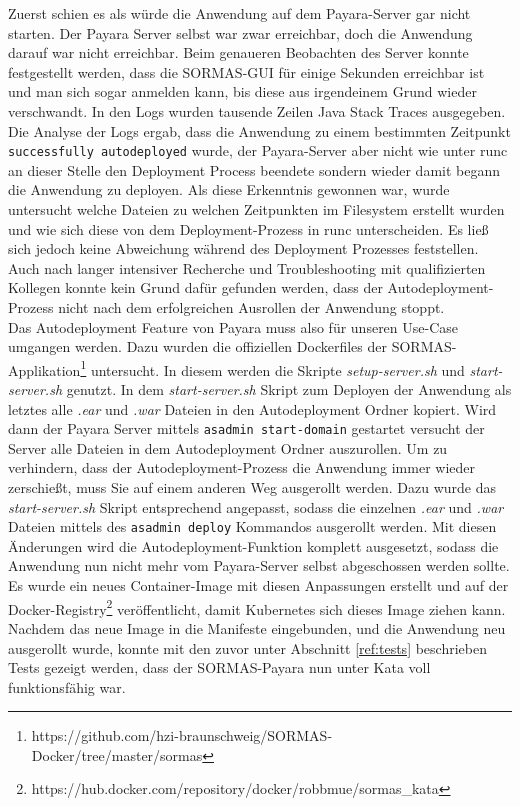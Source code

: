 Zuerst schien es als würde die Anwendung auf dem Payara-Server gar nicht starten. 
Der Payara Server selbst war zwar erreichbar, doch die Anwendung darauf war nicht erreichbar.
Beim genaueren Beobachten des Server konnte festgestellt werden, dass die \ac{SORMAS}-\ac{GUI} für einige Sekunden erreichbar ist und man sich sogar anmelden kann, bis diese aus irgendeinem Grund wieder verschwandt.
In den Logs wurden tausende Zeilen Java Stack Traces ausgegeben. 
Die Analyse der Logs ergab, dass die Anwendung zu einem bestimmten Zeitpunkt \texttt{successfully autodeployed} wurde, der Payara-Server aber nicht wie unter runc an dieser Stelle den Deployment Process beendete sondern wieder damit begann die Anwendung zu deployen.
Als diese Erkenntnis gewonnen war, wurde untersucht welche Dateien zu welchen Zeitpunkten im Filesystem erstellt wurden und wie sich diese von dem Deployment-Prozess in runc unterscheiden. 
Es ließ sich jedoch keine Abweichung während des Deployment Prozesses feststellen.
Auch nach langer intensiver Recherche und Troubleshooting mit qualifizierten Kollegen konnte kein Grund dafür gefunden werden, dass der Autodeployment-Prozess nicht nach dem erfolgreichen Ausrollen der Anwendung stoppt. 
\\
Das Autodeployment Feature von Payara muss also für unseren Use-Case umgangen werden. 
Dazu wurden die offiziellen Dockerfiles der \ac{SORMAS}-Applikation\footnote{https://github.com/hzi-braunschweig/SORMAS-Docker/tree/master/sormas} untersucht. 
In diesem werden die Skripte \textit{setup-server.sh} und \textit{start-server.sh} genutzt.
In dem \textit{start-server.sh} Skript zum Deployen der Anwendung als letztes alle \textit{.ear} und \textit{.war} Dateien in den Autodeployment Ordner kopiert.
Wird dann der Payara Server mittels \texttt{asadmin start-domain} gestartet versucht der Server alle Dateien in dem Autodeployment Ordner auszurollen.
Um zu verhindern, dass der Autodeployment-Prozess die Anwendung immer wieder zerschießt, muss Sie auf einem anderen Weg ausgerollt werden.
Dazu wurde das \textit{start-server.sh} Skript entsprechend angepasst, sodass die einzelnen \textit{.ear} und \textit{.war} Dateien mittels des \texttt{asadmin deploy} Kommandos ausgerollt werden.
Mit diesen Änderungen wird die Autodeployment-Funktion komplett ausgesetzt, sodass die Anwendung nun nicht mehr vom Payara-Server selbst abgeschossen werden sollte.
Es wurde ein neues Container-Image mit diesen Anpassungen erstellt und auf der Docker-Registry\footnote{https://hub.docker.com/repository/docker/robbmue/sormas\_kata} veröffentlicht, damit Kubernetes sich dieses Image ziehen kann.
Nachdem das neue Image in die Manifeste eingebunden, und die Anwendung neu ausgerollt wurde, konnte mit den zuvor unter Abschnitt \ref{ref:tests} beschrieben Tests gezeigt werden, dass der \ac{SORMAS}-Payara nun unter Kata voll funktionsfähig war.



